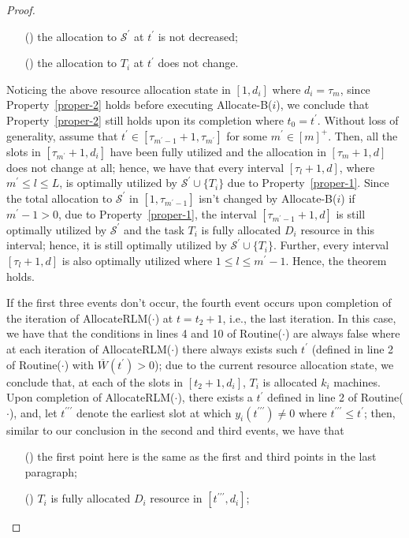\documentclass[10pt,journal,compsoc]{IEEEtran}
\newcommand{\rmnum}[1]{\romannumeral #1}
\begin{document}
\begin{proof}
\begin{enumerate}
\item [(\rmnum{3})] the allocation to $\mathcal{S}^{\prime}$ at $t^{\prime}$ is not decreased;

\item [(\rmnum{4})] the allocation to $T_{i}$ at $t^{\prime}$ does not change.
\end{enumerate}
Noticing the above resource allocation state in $[1, d_{i}]$ where $d_{i}=\tau_{m}$, since Property~\ref{proper-2} holds before executing Allocate-B($i$), we conclude that Property~\ref{proper-2} still holds upon its completion where $t_{0}=t^{\prime}$. Without loss of generality, assume that $t^{\prime}\in [\tau_{m^{\prime}-1}+1, \tau_{m^{\prime}}]$ for some $m^{\prime}\in [m]^{+}$. Then, all the slots in $[\tau_{m^{\prime}}+1, d_{i}]$ have been fully utilized and the allocation in $[\tau_{m}+1, d]$ does not change at all; hence, we have that every interval $[\tau_{l}+1, d]$, where $m^{\prime}\leq l\leq L$, is optimally utilized by $\mathcal{S}^{\prime}\cup\{T_{i}\}$ due to Property~\ref{proper-1}. Since the total allocation to $\mathcal{S}^{\prime}$ in $[1, \tau_{m^{\prime}-1}]$ isn't changed by Allocate-B($i$) if $m^{\prime}-1>0$, due to Property~\ref{proper-1}, the interval $[\tau_{m^{\prime}-1}+1, d]$ is still optimally utilized by $\mathcal{S}^{\prime}$ and the task $T_{i}$ is fully allocated $D_{i}$ resource in this interval; hence, it is still optimally utilized by $\mathcal{S}^{\prime}\cup\{T_{i}\}$. Further, every interval $[\tau_{l}+1, d]$ is also optimally utilized where $1\leq l\leq m^{\prime}-1$. Hence, the theorem holds.


If the first three events don't occur, the fourth event occurs upon completion of the iteration of AllocateRLM($\cdot$) at $t=t_{2}+1$, i.e., the last iteration. In this case, we have that the conditions in lines 4 and 10 of Routine($\cdot$) are always false where at each iteration of AllocateRLM($\cdot$) there always exists such $t^{\prime}$ (defined in line 2 of Routine($\cdot$) with $\overline{W}(t^{\prime})>0$); due to the current resource allocation state, we conclude that, at each of the slots in $[t_{2}+1, d_{i}]$, $T_{i}$ is allocated $k_{i}$ machines. Upon completion of AllocateRLM($\cdot$), there exists a $t^{\prime}$ defined in line 2 of Routine($\cdot$), and, let $t^{\prime\prime\prime}$ denote the earliest slot at which $y_{i}(t^{\prime\prime\prime})\neq 0$ where $t^{\prime\prime\prime} \leq  t^{\prime}$; then, similar to our conclusion in the second and third events, we have that
\begin{enumerate}
 \setlength\itemsep{0.1em}
\item [(\rmnum{1})] the first point here is the same as the first and third points in the last paragraph;
\item [(\rmnum{2})] $T_{i}$ is fully allocated $D_{i}$ resource in $[t^{\prime\prime\prime}, d_{i}]$;


\end{enumerate}
\end{proof}
\end{document}
